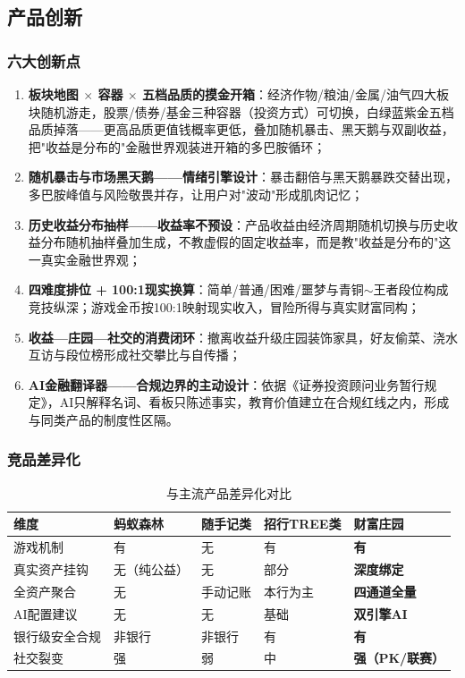 \documentclass[12pt,a4paper]{ctexart}
\begin{document}
\subsection{产品创新}

\subsubsection{六大创新点}
\begin{enumerate}
  \item \textbf{板块地图 $\times$ 容器 $\times$ 五档品质的摸金开箱}：经济作物/粮油/金属/油气四大板块随机游走，股票/债券/基金三种容器（投资方式）可切换，白绿蓝紫金五档品质掉落——更高品质更值钱概率更低，叠加随机暴击、黑天鹅与双副收益，把"收益是分布的"金融世界观装进开箱的多巴胺循环；
  \item \textbf{随机暴击与市场黑天鹅——情绪引擎设计}：暴击翻倍与黑天鹅暴跌交替出现，多巴胺峰值与风险敬畏并存，让用户对"波动"形成肌肉记忆；
  \item \textbf{历史收益分布抽样——收益率不预设}：产品收益由经济周期随机切换与历史收益分布随机抽样叠加生成，不教虚假的固定收益率，而是教"收益是分布的"这一真实金融世界观；
  \item \textbf{四难度排位 + 100:1现实换算}：简单/普通/困难/噩梦与青铜$\sim$王者段位构成竞技纵深；游戏金币按100:1映射现实收入，冒险所得与真实财富同构；
  \item \textbf{收益—庄园—社交的消费闭环}：撤离收益升级庄园装饰家具，好友偷菜、浇水互访与段位榜形成社交攀比与自传播；
  \item \textbf{AI金融翻译器——合规边界的主动设计}：依据《证券投资顾问业务暂行规定》，AI只解释名词、看板只陈述事实，教育价值建立在合规红线之内，形成与同类产品的制度性区隔。
\end{enumerate}

\subsubsection{竞品差异化}
\begin{table}[htbp]
\centering
\begin{tabular}{p{2.8cm}p{2.6cm}p{2.4cm}p{2.4cm}p{2.8cm}}
\toprule
\textbf{维度} & \textbf{蚂蚁森林} & \textbf{随手记类} & \textbf{招行TREE类} & \textbf{财富庄园} \\
\midrule
游戏机制 & 有 & 无 & 有 & \textbf{有} \\
真实资产挂钩 & 无（纯公益） & 无 & 部分 & \textbf{深度绑定} \\
全资产聚合 & 无 & 手动记账 & 本行为主 & \textbf{四通道全量} \\
AI配置建议 & 无 & 无 & 基础 & \textbf{双引擎AI} \\
银行级安全合规 & 非银行 & 非银行 & 有 & \textbf{有} \\
社交裂变 & 强 & 弱 & 中 & \textbf{强（PK/联赛）} \\
\bottomrule
\end{tabular}
\caption{与主流产品差异化对比}
\end{table}
\end{document}
